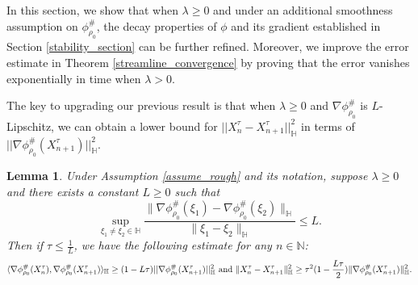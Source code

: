 \documentclass[11pt,a4paper]{amsart}
\newcommand{\1}{\mathds{1}}
\newtheorem{lemma}[theorem]{\textbf{Lemma}}
\numberwithin{equation}{section}
\begin{document}
In this section, we show that when $\lambda \geq 0$ and under an additional smoothness assumption on $\phi^{\#}_{\rho_0}$, the decay properties of $\phi$ and its gradient established in Section \ref{stability_section} can be further refined. Moreover, we improve the error estimate in Theorem \ref{streamline_convergence} by proving that the error vanishes exponentially in time when $\lambda>0$. \smallskip

The key to upgrading our previous result is that when $\lambda \geq 0$ and $\nabla \phi^{\#}_{\rho_0}$ is $L$-Lipschitz, we can obtain a lower bound for $||X_n^{\tau}-X_{n+1}^{\tau}||^2_{\mathbb{H}}$ in terms of $||\nabla \phi^{\#}_{\rho_0}(X^{\tau}_{n+1})||^2_{\mathbb{H}}.$

\begin{lemma}
Under Assumption \ref{assume_rough} and its notation, suppose $\lambda \geq 0$ and there exists a constant $L \geq 0$ such that
\[
\sup_{\xi_1 \neq \xi_2 \in \mathbb{H}} \frac{\|\nabla \phi^{\#}_{\rho_0}(\xi_1) - \nabla \phi^{\#}_{\rho_0}(\xi_2)\|_{\mathbb{H}}}{\|\xi_1 - \xi_2\|_{\mathbb{H}}} \leq L.
\]
Then if $\tau \leq \frac{1}{L}$, we have the following estimate for any $n \in \mathbb{N}$:
\begin{equation} \label{distance_lower_bound} \langle \nabla \phi^{\#}_{\rho_0}(X^{\tau}_n), \nabla \phi^{\#}_{\rho_0}(X^{\tau}_{n+1}) \rangle_{\mathbb{H}} \geq  (1-L \tau) ||\nabla \phi^{\#}_{\rho_0}(X^{\tau}_{n+1})||_{\mathbb{H}}^2  \textnormal{ and }
\|X_n^{\tau} - X_{n+1}^{\tau}\|_{\mathbb{H}}^2 \geq \tau^2(1-\frac{L \tau}{2} ) \|\nabla \phi^{\#}_{\rho_0}(X_{n+1}^{\tau})\|^2_{\mathbb{H}}. \end{equation} 
\end{lemma}
\end{document}
